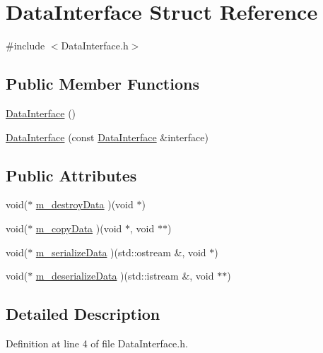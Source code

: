 \hypertarget{struct_data_interface}{}\section{Data\+Interface Struct Reference}
\label{struct_data_interface}


{\ttfamily \#include $<$Data\+Interface.\+h$>$}

\subsection*{Public Member Functions}
\begin{DoxyCompactItemize}
\item 
\mbox{\hyperlink{struct_data_interface_a6c52feeda005b02d5172573c7c4d4a24}{Data\+Interface}} ()
\item 
\mbox{\hyperlink{struct_data_interface_a4e1adf6b36493994157224248beacf85}{Data\+Interface}} (const \mbox{\hyperlink{struct_data_interface}{Data\+Interface}} \&interface)
\end{DoxyCompactItemize}
\subsection*{Public Attributes}
\begin{DoxyCompactItemize}
\item 
void($\ast$ \mbox{\hyperlink{struct_data_interface_af6e607324293e0206fda4acbdfafe043}{m\+\_\+destroy\+Data}} )(void $\ast$)
\item 
void($\ast$ \mbox{\hyperlink{struct_data_interface_a861c2689215956b596d6f1e9d279dd94}{m\+\_\+copy\+Data}} )(void $\ast$, void $\ast$$\ast$)
\item 
void($\ast$ \mbox{\hyperlink{struct_data_interface_a111a5b62fe0a45d937795853c8337d06}{m\+\_\+serialize\+Data}} )(std\+::ostream \&, void $\ast$)
\item 
void($\ast$ \mbox{\hyperlink{struct_data_interface_a53674c91ee0983fb20429291631d88f0}{m\+\_\+deserialize\+Data}} )(std\+::istream \&, void $\ast$$\ast$)
\end{DoxyCompactItemize}


\subsection{Detailed Description}


Definition at line 4 of file Data\+Interface.\+h.



